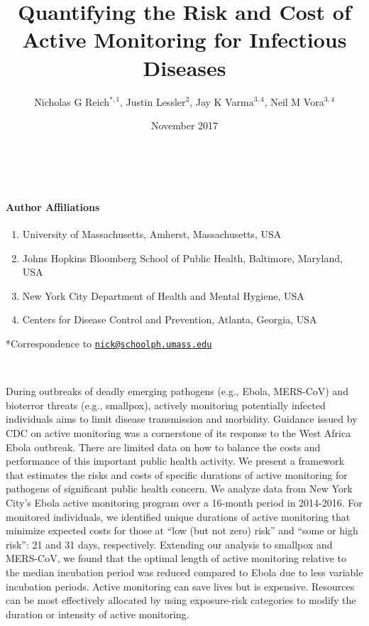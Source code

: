 \documentclass[]{article}
\title{Quantifying the Risk and Cost of Active Monitoring for Infectious
Diseases}
\author{Nicholas G Reich\(^{*,1}\), Justin Lessler\(^{2}\), Jay K
Varma\(^{3,4}\), Neil M Vora\(^{3,4}\)}
\date{November 2017}
\providecommand{\tightlist}{%
  \setlength{\itemsep}{0pt}\setlength{\parskip}{0pt}}
\let\oldparagraph\paragraph
\renewcommand{\paragraph}[1]{\oldparagraph{#1}\mbox{}}
\begin{document}
\maketitle

~

\paragraph{Author Affiliations}\label{author-affiliations}

\begin{enumerate}
\def\labelenumi{\arabic{enumi}.}
\tightlist
\item
  University of Massachusetts, Amherst, Massachusetts, USA
\item
  Johns Hopkins Bloomberg School of Public Health, Baltimore, Maryland,
  USA
\item
  New York City Department of Health and Mental Hygiene, USA
\item
  Centers for Disease Control and Prevention, Atlanta, Georgia, USA
\end{enumerate}

*Correspondence to
\href{mailto:nick@schoolph.umass.edu}{\nolinkurl{nick@schoolph.umass.edu}}

~

During outbreaks of deadly emerging pathogens (e.g., Ebola, MERS-CoV)
and bioterror threats (e.g., smallpox), actively monitoring potentially
infected individuals aims to limit disease transmission and morbidity.
Guidance issued by CDC on active monitoring was a cornerstone of its
response to the West Africa Ebola outbreak. There are limited data on
how to balance the costs and performance of this important public health
activity. We present a framework that estimates the risks and costs of
specific durations of active monitoring for pathogens of significant
public health concern. We analyze data from New York City's Ebola active
monitoring program over a 16-month period in 2014-2016. For monitored
individuals, we identified unique durations of active monitoring that
minimize expected costs for those at ``low (but not zero) risk'' and
``some or high risk'': 21 and 31 days, respectively. Extending our
analysis to smallpox and MERS-CoV, we found that the optimal length of
active monitoring relative to the median incubation period was reduced
compared to Ebola due to less variable incubation periods. Active
monitoring can save lives but is expensive. Resources can be most
effectively allocated by using exposure-risk categories to modify the
duration or intensity of active monitoring.
\end{document}
